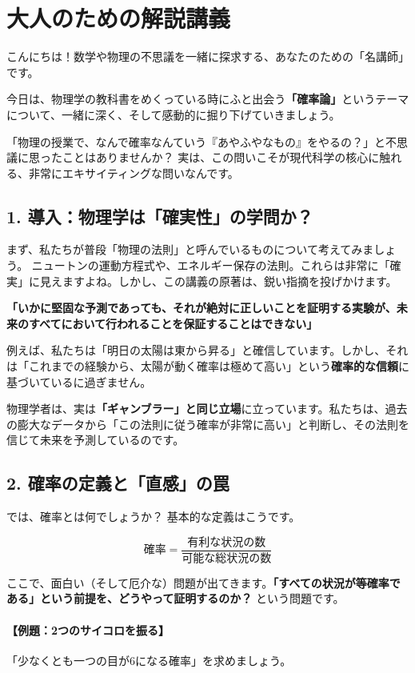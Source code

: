 \documentclass[a4paper,11pt,openany]{ltjsbook}
\begin{document}
\section{大人のための解説講義}
\begin{lecturebox}
こんにちは！数学や物理の不思議を一緒に探求する、あなたのための「名講師」です。

今日は、物理学の教科書をめくっている時にふと出会う\textbf{「確率論」}というテーマについて、一緒に深く、そして感動的に掘り下げていきましょう。

「物理の授業で、なんで確率なんていう『あやふやなもの』をやるの？」と不思議に思ったことはありませんか？ 実は、この問いこそが現代科学の核心に触れる、非常にエキサイティングな問いなんです。

\subsection*{1. 導入：物理学は「確実性」の学問か？}

まず、私たちが普段「物理の法則」と呼んでいるものについて考えてみましょう。
ニュートンの運動方程式や、エネルギー保存の法則。これらは非常に「確実」に見えますよね。しかし、この講義の原著は、鋭い指摘を投げかけます。

\textbf{「いかに堅固な予測であっても、それが絶対に正しいことを証明する実験が、未来のすべてにおいて行われることを保証することはできない」}

例えば、私たちは「明日の太陽は東から昇る」と確信しています。しかし、それは「これまでの経験から、太陽が動く確率は極めて高い」という\textbf{確率的な信頼}に基づいているに過ぎません。

物理学者は、実は\textbf{「ギャンブラー」と同じ立場}に立っています。私たちは、過去の膨大なデータから「この法則に従う確率が非常に高い」と判断し、その法則を信じて未来を予測しているのです。

\subsection*{2. 確率の定義と「直感」の罠}

では、確率とは何でしょうか？ 基本的な定義はこうです。

$$\text{確率} = \frac{\text{有利な状況の数}}{\text{可能な総状況の数}}$$

ここで、面白い（そして厄介な）問題が出てきます。\textbf{「すべての状況が等確率である」という前提を、どうやって証明するのか？} という問題です。

\paragraph{【例題：2つのサイコロを振る】}
「少なくとも一つの目が6になる確率」を求めましょう。


\end{lecturebox}
\end{document}
